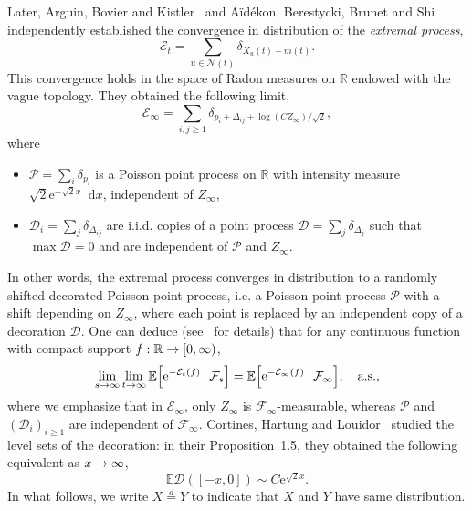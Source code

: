 \documentclass[AHL,Unicode,longabstracts,published]{cedram}
\newcommand{\e}{\mathrm{e}}
\renewcommand{\d}[1]{\mathop{}\!\mathrm{d}#1}
\newcommand{\E}{\mathbb{E}}
\newcommand{\R}{\mathbb{R}}
\newcommand\1{\mathds{1}}
\newcommand{\cD}{\mathcal{D}}
\newcommand{\cE}{\mathcal{E}}
\newcommand{\cF}{\mathcal{F}}
\newcommand{\cN}{\mathcal{N}}
\newcommand{\cP}{\mathcal{P}}
\let\originalleft\left
\let\originalright\right
\renewcommand{\left}{\mathopen{}\mathclose\bgroup\originalleft}
\renewcommand{\right}{\aftergroup\egroup\originalright}
\renewcommand*{\to}{\mathchoice{\longrightarrow}{\rightarrow}{\rightarrow}{\rightarrow}}
\begin{document}
Later, Arguin, Bovier and Kistler~\cite{ArguinBovierKistler2013} and A\"{i}dékon, Berestycki, Brunet and Shi~\cite{AidekonShi2014} independently established the convergence in distribution of the \emph{extremal process},
\begin{equation*}
\cE_t = \sum_{u \in \cN(t)} \delta_{X_u(t) - m(t)}.
\end{equation*}
This convergence holds in the space of Radon measures on $\R$ endowed with the vague topology. They obtained the following limit,
\begin{equation*}
\cE_\infty = \sum_{i, j \geq 1} \delta_{p_i + \Delta_{ij} + \log(C Z_\infty)/\sqrt{2}},
\end{equation*}
where
\begin{itemize}
\item $\cP = \sum_{i} \delta_{p_i}$ is a Poisson point process on $\R$ with intensity measure $\sqrt{2} \e^{-\sqrt{2}x} \d{x}$, independent of $Z_\infty$,
\item $\cD_i = \sum_j \delta_{\Delta_{ij}}$ are i.i.d. copies of a point process $\cD = \sum_j \delta_{\Delta_{j}}$ such that ${\max \cD = 0}$ and are independent of $\cP$ and $Z_\infty$.
\end{itemize}
In other words, the extremal process converges in distribution to a randomly shifted decorated Poisson point process, i.e. a Poisson point process $\cP$ with a shift depending on $Z_\infty$, where each point is replaced by an independent copy of a decoration $\cD$. One can deduce (see~\cite[Proposition~3.16]{Chataignier2024} for details) that for any continuous function with compact support $f : \R \to [0, \infty)$,
\begin{equation}\label{eq:convergence_extremal_process_conditionally}
\lim_{s \to \infty} \lim_{t \to \infty} \E \left[\e^{-\cE_t(f)}\,\middle|\, \cF_s \right] = \E \left[\e^{-\cE_\infty(f)} \,\middle|\, \cF_\infty \right], \quad \text{a.s.},
\end{equation}
where we emphasize that in $\cE_\infty$, only $Z_\infty$ is $\cF_\infty$-measurable, whereas $\cP$ and $(\cD_i)_{i\geq1}$ are independent of $\cF_\infty$. Cortines, Hartung and Louidor~\cite{CortinesHartungLouidor2019} studied the level sets of the decoration: in their Proposition~1.5, they obtained the following equivalent as $x \to \infty$,
\begin{equation}\label{eq:decoration_estimate}
\E\cD([-x, 0]) \sim C \e^{\sqrt{2} x}.
\end{equation}
In what follows, we write $X \overset{d}{=} Y$ to indicate that $X$ and $Y$ have same distribution.
\end{document}
